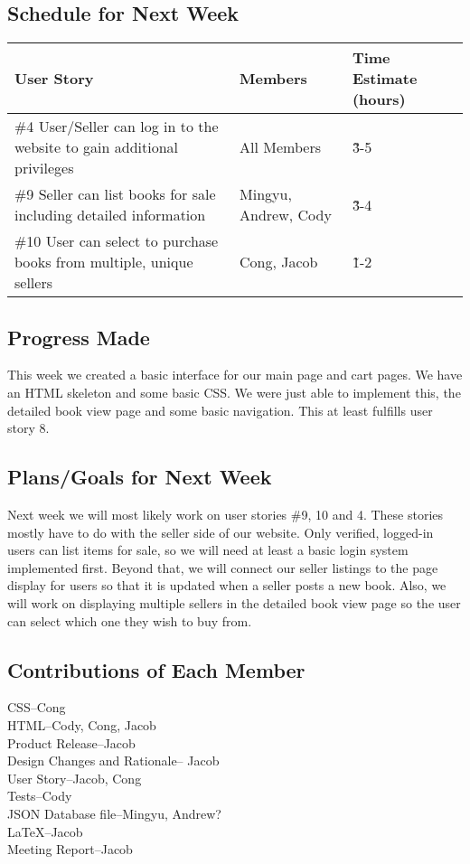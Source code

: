 \documentclass[12pt]{article}
\begin{document}
		\subsection{Schedule for Next Week}
		\begin{tabular}{ | p{60mm} | l | l | }
		\hline
		User Story & Members & Time Estimate (hours) \\ \hline
		\#4 User/Seller can log in to the website to gain additional privileges & All Members  & \~3-5	\\ \hline
		\#9 Seller can list books for sale including detailed information & Mingyu, Andrew, Cody & \~3-4  \\ \hline
		\#10 User can select to purchase books from multiple, unique sellers & Cong, Jacob & \~1-2 \\ \hline
		\end{tabular}

		\subsection{Progress Made}
		This week we created a basic interface for our main page and cart pages. We have an HTML skeleton and some basic CSS. We were just able to implement this, the detailed book view page and some basic navigation. This at least fulfills user story 8.

		\subsection{Plans/Goals for Next Week}
		Next week we will most likely work on user stories \#9, 10 and 4. These stories mostly have to do with the seller side of our website. Only verified, logged-in users can list items for sale, so we will need at least a basic login system implemented first. Beyond that, we will connect our seller listings to the page display for users so that it is updated when a seller posts a new book. Also, we will work on displaying multiple sellers in the detailed book view page so the user can select which one they wish to buy from.

		\subsection{Contributions of Each Member}
			CSS--Cong \\
			HTML--Cody, Cong, Jacob \\
			Product Release--Jacob \\
			Design Changes and Rationale-- Jacob \\
			User Story--Jacob, Cong \\
			Tests--Cody \\
			JSON Database file--Mingyu, Andrew? \\
			LaTeX--Jacob \\
			Meeting Report--Jacob \\
\end{document}
